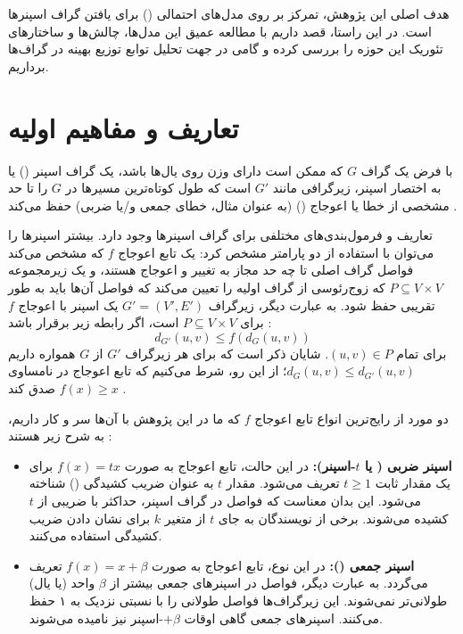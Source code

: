 \documentclass[12pt,a4paper]{article}
\begin{document}
هدف اصلی این پژوهش، تمرکز بر روی مدل‌های احتمالی () برای یافتن گراف اسپنرها است. در این راستا، قصد داریم با مطالعه عمیق این مدل‌ها، چالش‌ها و ساختارهای تئوریک این حوزه را بررسی کرده و گامی در جهت تحلیل توابع توزیع بهینه در گراف‌ها برداریم.

\section{تعاریف و مفاهیم اولیه}
با فرض یک گراف $G$ که ممکن است دارای وزن روی یال‌ها باشد، یک گراف اسپنر () یا به اختصار اسپنر، زیرگرافی مانند $G'$ است که طول کوتاه‌ترین مسیرها در $G$ را تا حد مشخصی از خطا یا اعوجاج () (به عنوان مثال، خطای جمعی و/یا ضربی) حفظ می‌کند \cite{survey}. 

تعاریف و فرمول‌بندی‌های مختلفی برای گراف اسپنرها وجود دارد. بیشتر اسپنرها را می‌توان با استفاده از دو پارامتر مشخص کرد: یک تابع اعوجاج $f$ که مشخص می‌کند فواصل گراف اصلی تا چه حد مجاز به تغییر و اعوجاج هستند، و یک زیرمجموعه $P \subseteq V \times V$ که زوج‌رئوسی از گراف اولیه را تعیین می‌کند که فواصل آن‌ها باید به طور تقریبی حفظ شود. به عبارت دیگر، زیرگراف $G' = (V', E')$ یک اسپنر با اعوجاج $f$ برای $P \subseteq V \times V$ است، اگر رابطه زیر برقرار باشد \cite{survey}:
$$d_{G'}(u, v) \le f(d_G(u, v))$$
برای تمام $(u, v) \in P$. شایان ذکر است که برای هر زیرگراف $G'$ از $G$ همواره داریم $d_G(u, v) \le d_{G'}(u, v)$؛ از این رو، شرط می‌کنیم که تابع اعوجاج در نامساوی $f(x) \ge x$ صدق کند \cite{survey}.

\vspace{0.4cm}
\noindent دو مورد از رایج‌ترین انواع تابع اعوجاج $f$ که ما در این پژوهش با آن‌ها سر و کار داریم، به شرح زیر هستند \cite{survey}:
\begin{itemize}
    \item \textbf{اسپنر ضربی ( یا $t$-اسپنر):} در این حالت، تابع اعوجاج به صورت $f(x) = tx$ برای یک مقدار ثابت $t \ge 1$ تعریف می‌شود. مقدار $t$ به عنوان ضریب کشیدگی () شناخته می‌شود. این بدان معناست که فواصل در گراف اسپنر، حداکثر با ضریبی از $t$ کشیده می‌شوند. برخی از نویسندگان به جای $t$ از متغیر $k$ برای نشان دادن ضریب کشیدگی استفاده می‌کنند.
    \item \textbf{اسپنر جمعی ():} در این نوع، تابع اعوجاج به صورت $f(x) = x + \beta$ تعریف می‌گردد. به عبارت دیگر، فواصل در اسپنرهای جمعی بیشتر از $\beta$ واحد (یا یال) طولانی‌تر نمی‌شوند. این زیرگراف‌ها فواصل طولانی را با نسبتی نزدیک به ۱ حفظ می‌کنند. اسپنرهای جمعی گاهی اوقات $+\beta$-اسپنر نیز نامیده می‌شوند.
\end{itemize}
\end{document}
